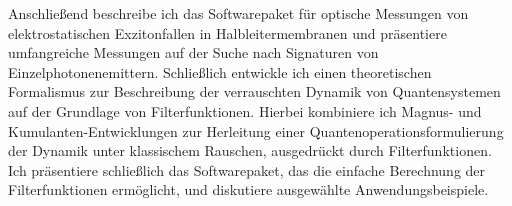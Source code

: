 {    Anschließend beschreibe ich das \mjolnir Softwarepaket für optische Messungen von elektrostatischen Exzitonfallen in Halbleitermembranen und präsentiere umfangreiche Messungen auf der Suche nach Signaturen von Einzelphotonenemittern.
    Schließlich entwickle ich einen theoretischen Formalismus zur Beschreibung der verrauschten Dynamik von Quantensystemen auf der Grundlage von Filterfunktionen.
    Hierbei kombiniere ich Magnus- und Kumulanten-Entwicklungen zur Herleitung einer Quantenoperationsformulierung der Dynamik unter klassischem Rauschen, ausgedrückt durch Filterfunktionen.
    Ich präsentiere schließlich das \filterfunctions Softwarepaket, das die einfache Berechnung der Filterfunktionen ermöglicht, und diskutiere ausgewählte Anwendungsbeispiele.
}

\author{\authorName}
\title{\thesisTitle}
\date{\thesisDate}

